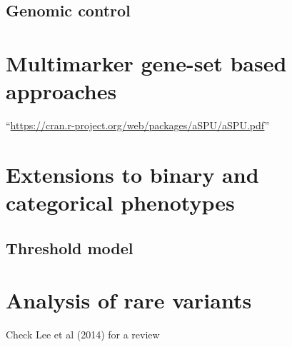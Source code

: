 \documentclass[]{book}
\theoremstyle{definition}
\theoremstyle{definition}
\theoremstyle{definition}
\theoremstyle{remark}
\begin{document}
\subsection{Genomic control}\label{genomic-control}

\section{Multimarker gene-set based
approaches}\label{multimarker-gene-set-based-approaches}

``\url{https://cran.r-project.org/web/packages/aSPU/aSPU.pdf}''

\section{Extensions to binary and categorical
phenotypes}\label{extensions-to-binary-and-categorical-phenotypes}

\subsection{Threshold model}\label{threshold-model}

\section{Analysis of rare variants}\label{analysis-of-rare-variants}

Check Lee et al (2014) for a review
\end{document}
